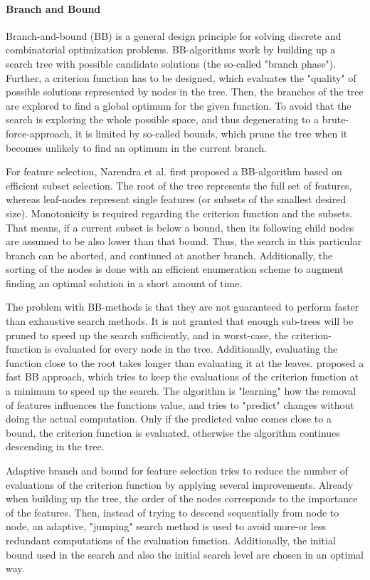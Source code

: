 \paragraph{Branch and Bound}
\label{par:methods.flat.wrapper.branch_and_bound}


Branch-and-bound (BB) is a general design principle for solving discrete and
combinatorial optimization problems.  BB-algorithms work by building up a search
tree with possible candidate  solutions (the so-called "branch phase"). Further,
a criterion function has to be designed,  which evaluates the "quality" of
possible solutions represented by  nodes in the tree. Then, the branches of the
tree are explored to find a global  optimum for the given function. To avoid
that the search is exploring the whole  possible space, and thus degenerating to
a brute-force-approach, it is limited  by so-called bounds, which prune the tree
when it becomes unlikely to find an  optimum in the current branch.

For feature selection, Narendra et al. \cite{Narendra:77} first proposed a
BB-algorithm based on efficient subset  selection. The root of the tree
represents the full set of  features, whereas leaf-nodes represent single
features (or subsets of the  smallest desired size). Monotonicity is required
regarding the criterion  function and the subsets. That means, if a current
subset is below a bound,  then its following child nodes are assumed to be also
lower than that bound.  Thus, the search in this particular branch can be
aborted, and continued at  another branch. Additionally, the sorting of the
nodes is done with an  efficient enumeration scheme to augment finding an
optimal solution in a short  amount of time.

The problem with BB-methods is that they are not guaranteed to perform faster
than exhaustive search  methods. It is not granted that enough sub-trees will be
pruned to speed up  the search sufficiently, and in worst-case, the
criterion-function is evaluated  for every node in the tree. Additionally,
evaluating the function  close to the root takes longer than evaluating it at
the leaves.  \cite{Somol:04} proposed a fast BB approach, which tries to keep
the evaluations  of the criterion function at a minimum to speed up the search.
The algorithm  is "learning" how the removal of features influences the
functions value, and  tries to "predict" changes without doing the actual
computation. Only if  the predicted value comes close to a bound, the criterion
function is  evaluated, otherwise the algorithm continues descending in the tree.

Adaptive branch and bound for feature selection \cite{Nakariyakul:07} tries to
reduce the  number of evaluations of the criterion function by applying several
improvements.  Already when building up the tree, the order of the nodes
corresponds to the  importance of the features. Then, instead of trying to
descend sequentially  from node to node, an adaptive, "jumping" search method is
used to  avoid more-or less redundant computations of the evaluation function.
Additionally,  the initial bound used in the search and also the initial search
level are  chosen in an optimal way.

